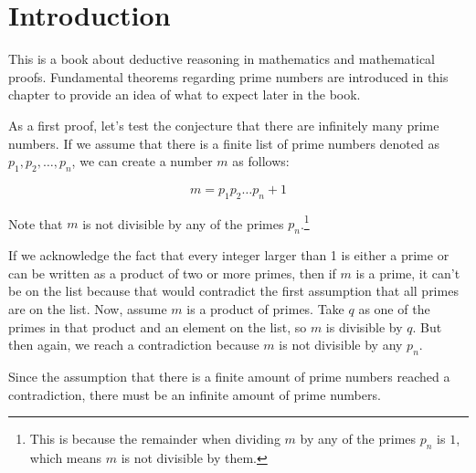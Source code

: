 \chapter{Introduction}

This is a book about deductive reasoning in mathematics and mathematical proofs. Fundamental theorems regarding prime numbers are introduced in this chapter to provide an idea of what to expect later in the book.

As a first proof, let's test the conjecture that there are infinitely many prime numbers. If we assume that there is a finite list of prime numbers denoted as $p_1, p_2, \ldots, p_n$, we can create a number $m$ as follows:

\[
m = p_1p_2 \ldots p_n + 1
\]

Note that $m$ is not divisible by any of the primes $p_n$.\footnote{This is because the remainder when dividing $m$ by any of the primes $p_n$ is $1$, which means $m$ is not divisible by them.}

If we acknowledge the fact that every integer larger than 1 is either a prime or can be written as a product of two or more primes, then if $m$ is a prime, it can't be on the list because that would contradict the first assumption that all primes are on the list. Now, assume $m$ is a product of primes. Take $q$ as one of the primes in that product and an element on the list, so $m$ is divisible by $q$. But then again, we reach a contradiction because $m$ is not divisible by any $p_n$.

Since the assumption that there is a finite amount of prime numbers reached a contradiction, there must be an infinite amount of prime numbers.


